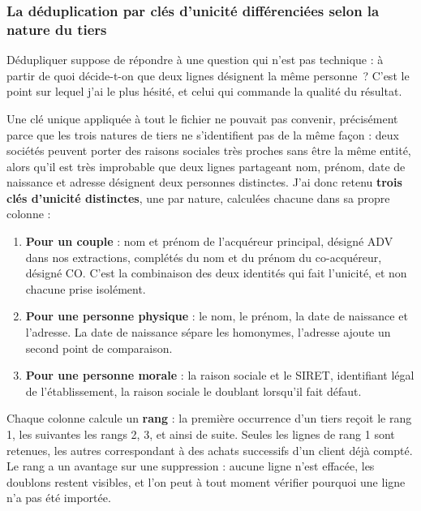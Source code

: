 \hypertarget{la-duxe9duplication-par-cluxe9s-dunicituxe9-diffuxe9renciuxe9es-selon-la-nature-du-tiers}{%
\subsubsection{La déduplication par clés d'unicité différenciées selon la nature du tiers}\label{la-duxe9duplication-par-cluxe9s-dunicituxe9-diffuxe9renciuxe9es-selon-la-nature-du-tiers}}

Dédupliquer suppose de répondre à une question qui n'est pas technique : à partir de quoi
décide-t-on que deux lignes désignent la même personne~? C'est le point sur lequel j'ai le
plus hésité, et celui qui commande la qualité du résultat.

Une clé unique appliquée à tout le fichier ne pouvait pas convenir, précisément parce que les
trois natures de tiers ne s'identifient pas de la même façon : deux sociétés peuvent porter des
raisons sociales très proches sans être la même entité, alors qu'il est très improbable que
deux lignes partageant nom, prénom, date de naissance et adresse désignent deux personnes
distinctes. J'ai donc retenu \textbf{trois clés d'unicité distinctes}, une par nature, calculées
chacune dans sa propre colonne :

\begin{enumerate}
\def\labelenumi{\arabic{enumi}.}

\item
  \textbf{Pour un couple} : nom et prénom de l'acquéreur principal, désigné ADV dans nos
  extractions, complétés du nom et du prénom du co-acquéreur, désigné CO. C'est la
  combinaison des deux identités qui fait l'unicité, et non chacune prise isolément.
\item
  \textbf{Pour une personne physique} : le nom, le prénom, la date de naissance et l'adresse. La
  date de naissance sépare les homonymes, l'adresse ajoute un second point de comparaison.
\item
  \textbf{Pour une personne morale} : la raison sociale et le SIRET, identifiant légal de
  l'établissement, la raison sociale le doublant lorsqu'il fait défaut.
\end{enumerate}

Chaque colonne calcule un \textbf{rang} : la première occurrence d'un tiers reçoit le rang 1, les
suivantes les rangs 2, 3, et ainsi de suite. Seules les lignes de rang 1 sont retenues, les
autres correspondant à des achats successifs d'un client déjà compté. Le rang a un avantage
sur une suppression : aucune ligne n'est effacée, les doublons restent visibles, et l'on peut
à tout moment vérifier pourquoi une ligne n'a pas été importée.

